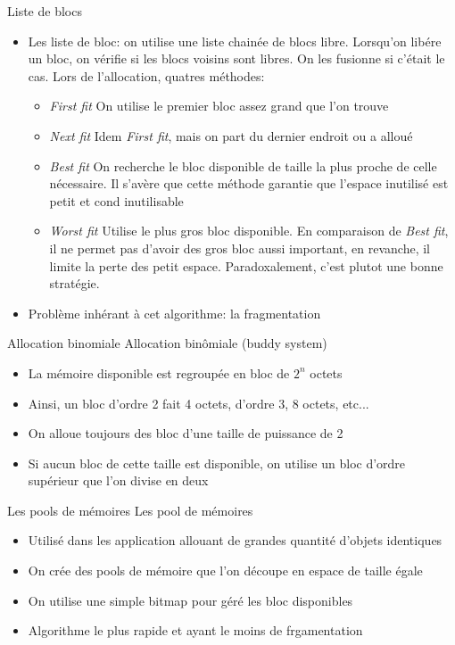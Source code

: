 \begin{frame}[fragile=singleslide]{Liste de blocs}
  \begin{itemize}
  \item  Les liste  de bloc:  on utilise  une liste  chainée  de blocs
    libre. Lorsqu'on libére  un bloc, on vérifie si  les blocs voisins
    sont  libres.   On  les  fusionne  si c'était  le  cas.   Lors  de
    l'allocation, quatres méthodes:
    \begin{itemize}
    \item \emph{First fit} On utilise  le premier bloc assez grand que
      l'on trouve
    \item  \emph{Next fit}  Idem  \emph{First fit},  mais  on part  du
      dernier endroit ou a alloué
    \item \emph{Best fit} On recherche le bloc disponible de taille la
      plus proche  de celle nécessaire.  Il s'avère  que cette méthode
      garantie que l'espace inutilisé est petit et cond inutilisable
    \item \emph{Worst  fit} Utilise le  plus gros bloc  disponible. En
      comparaison  de \emph{Best fit},  il ne  permet pas  d'avoir des
      gros bloc aussi  important, en revanche, il limite  la perte des
      petit espace.  Paradoxalement, c'est plutot une bonne stratégie.
    \end{itemize}
  \item Problème inhérant à cet algorithme: la fragmentation
  \end{itemize}
\end{frame}

\begin{frame}[fragile=singleslide]{Allocation binomiale}
  Allocation binômiale (buddy system)
  \begin{itemize}
  \item La mémoire disponible est regroupée en bloc de $2^n$ octets
  \item Ainsi, un  bloc d'ordre 2 fait 4 octets,  d'ordre 3, 8 octets,
    etc...
  \item On alloue toujours des bloc d'une taille de puissance de 2
  \item Si  aucun bloc de cette  taille est disponible,  on utilise un
    bloc d'ordre supérieur que l'on divise en deux
  \end{itemize}
\end{frame}

\begin{frame}[fragile=singleslide]{Les pools de mémoires}
  Les pool de mémoires
  \begin{itemize}
  \item  Utilisé dans  les  application allouant  de grandes  quantité
    d'objets identiques
  \item On  crée des pools  de mémoire que  l'on découpe en  espace de
    taille égale
  \item On utilise une simple bitmap pour géré les bloc disponibles
  \item Algorithme le plus rapide et ayant le moins de frgamentation
  \end{itemize}
\end{frame}

